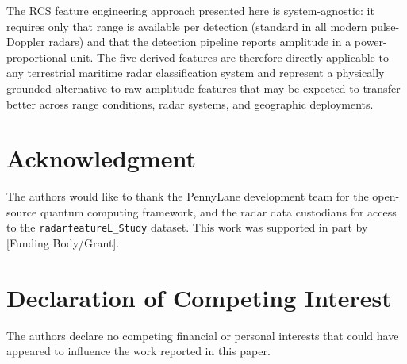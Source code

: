 \documentclass[journal]{IEEEtran}
\begin{document}
\medskip
The RCS feature engineering approach presented here is system-agnostic:
it requires only that range is available per detection (standard in all
modern pulse-Doppler radars) and that the detection pipeline reports
amplitude in a power-proportional unit. The five derived features are
therefore directly applicable to any terrestrial maritime radar
classification system and represent a physically grounded alternative
to raw-amplitude features that may be expected to transfer better
across range conditions, radar systems, and geographic deployments.

\section*{Acknowledgment}
The authors would like to thank the PennyLane development team for the open-source quantum computing framework, and the radar data custodians for access to the \texttt{radarfeatureL\_Study} dataset. This work was supported in part by [Funding Body/Grant].

\section*{Declaration of Competing Interest}
The authors declare no competing financial or personal interests that could have appeared to influence the work reported in this paper.
\end{document}
